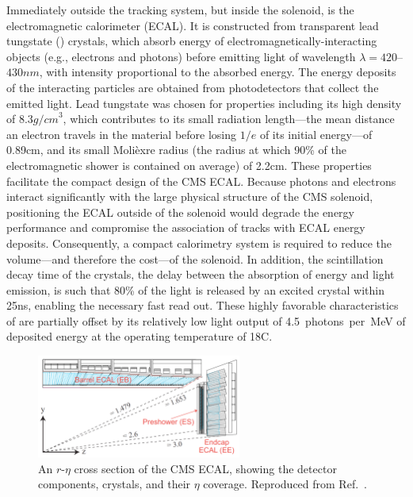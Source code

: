 Immediately outside the tracking system, but inside the solenoid, is the electromagnetic 
calorimeter (ECAL). It is constructed from transparent lead tungstate (\PbT) crystals, which
absorb energy of electromagnetically-interacting objects (e.g., electrons and photons) before emitting
light of wavelength $\lambda = 420$--$430\unit{nm}$, with intensity proportional to the absorbed energy.
The energy deposits of the interacting particles are obtained from
photodetectors that collect the emitted light.
Lead tungstate was chosen for properties including its high density of $8.3\unit{g/cm}^3$, which contributes
to its small radiation length---the mean distance an electron travels
in the material before losing $1/e$ of its initial energy---of 0.89\unit{cm},
and its small Moli{\`e}xre radius (the radius at which 90\% of the electromagnetic
shower is contained on average) of 2.2\unit{cm}. These properties facilitate the 
compact design of the CMS ECAL. Because photons and electrons interact significantly
with the large physical structure of the CMS solenoid, positioning the ECAL outside
of the solenoid would degrade the energy performance and compromise the association
of tracks with ECAL energy deposits.
Consequently, a compact calorimetry system
is required to reduce the volume---and therefore the cost---of the solenoid.
In addition, the scintillation decay time of the crystals, the delay between the absorption of energy and light emission,
is such that 80\% of the light is released by an excited crystal within 25\unit{ns},
enabling the necessary fast read out. These highly favorable characteristics of {\PbT} are 
partially offset by its relatively low light output of 4.5~photons~per~MeV of deposited energy
at the operating temperature of 18\degree\unit{C}. 

\begin{figure}[htbp]
  \centering
   \includegraphics[width=0.6\textwidth]{figures/LHCandCMS/ecalCrossSection.png}
  \caption[An $r$-$\eta$ cross section of the CMS ECAL]{
    An $r$-$\eta$ cross section of the CMS ECAL, showing the detector components,
    crystals, and their $\eta$ coverage. Reproduced from Ref.~\cite{Benaglia:2014aqa}.
        }
 \label{fig:ecal}
\end{figure}

